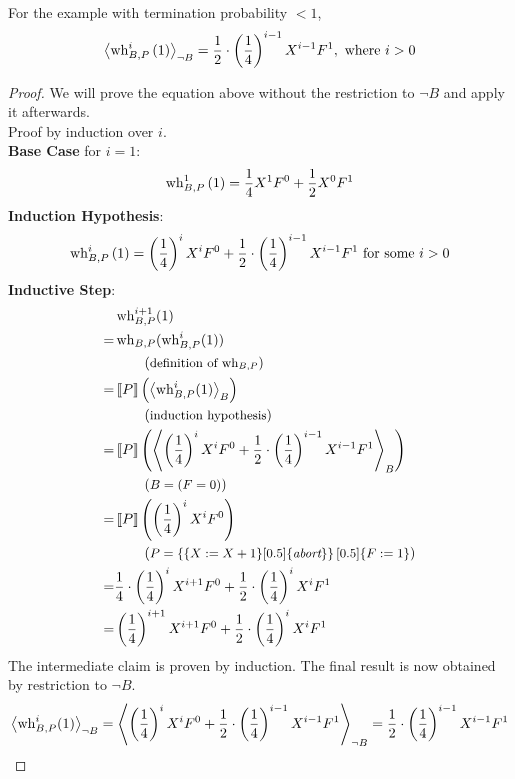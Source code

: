\begin{lemma}
	For the example with termination probability $< 1$,
	\[ \resN{\wh^i\l(1\r)} = \hf \cdot \l(\frac{1}{4}\r)^{i-1} X^{i-1} F^1 \where i > 0 \]
	\begin{proof}
		We will prove the equation above without the restriction to $\lnot B$ and apply it afterwards. \\
		Proof by induction over $i$. \\
		\textbf{Base Case} for $i = 1$: \\
		\[ \wh^1\l(1\r) = \qu X^1 F^0 + \hf X^0 F^1 \]
		\textbf{Induction Hypothesis}:
		\[ \wh^i\l(1\r) = \l(\qu\r)^i X^i F^0 + \hf \cdot \l(\qu\r)^{i-1} X^{i-1} F^1
			\text{ for some } i > 0 \]
		\textbf{Inductive Step}:
		\begin{align*}
			 & \wh^{i + 1}(1) \\
			=& \wh( \wh^i(1) ) \\
			 & \explain{definition of $\wh$} \\
			=& \smtx{P}\l( \resP{ \wh^i(1) } \r) \\
			 & \explain{induction hypothesis} \\
			=& \smtx{P}\l( \resP{ \l(\qu\r)^i X^i F^0 +
				\hf \cdot \l(\qu\r)^{i-1} X^{i-1} F^1 } \r) \\
			 & \explain{$B = (F = 0)$} \\
			=& \smtx{P}\l( \l(\qu\r)^i X^i F^0 \r) \\
			 & \explain{$P = \l\{ \{ X := X + 1 \}[0.5]\{ \abort \} \r\}
			 	[0.5] \{ F := 1 \}$} \\
			=& \qu \cdot \l(\qu\r)^i X^{i+1} F^0 + \hf \cdot \l(\qu\r)^i X^i F^1 \\
			=& \l(\qu\r)^{i+1} X^{i+1} F^0 + \hf \cdot \l(\qu\r)^i X^i F^1
		\end{align*}
		The intermediate claim is proven by induction.
		The final result is now obtained by restriction to $\lnot B$.
		\[ \resN{\wh^i(1)} = \resN{\l(\qu\r)^i X^i F^0 +
			\hf \cdot \l(\qu\r)^{i-1} X^{i-1} F^1}
			= \hf \cdot \l(\qu\r)^{i-1} X^{i-1} F^1			\qedhere \]
	\end{proof}
\end{lemma}